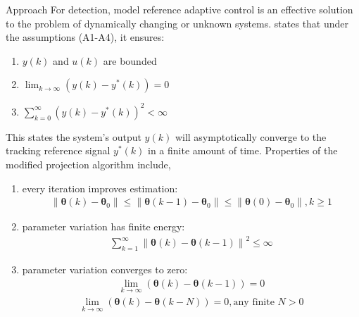 \begin{section}{Approach}
For detection, model reference adaptive control is an effective solution to the problem of dynamically changing or unknown systems. \cite{tao2003adaptive} states that under the assumptions (A1-A4), it ensures:
	\begin{enumerate}[label=(\roman*),leftmargin=4\parindent]
	\label{assumtions_ensure}
	\item $y(k)$ and $u(k)$ are bounded 
	\item $\lim_{k\to\infty}(y(k)-y^*(k))=0$
	\item $\sum_{k=0}^\infty(y(k)-y^*(k))^2<\infty$
	\end{enumerate}
This states the system's output $y(k)$ will asymptotically converge to the tracking reference signal $y^*(k)$ in a finite amount of time. Properties of the modified projection algorithm include,
    \begin{enumerate}[label=(\roman*),leftmargin=3\parindent]
	\item every iteration improves estimation:
	    \begin{align}
	        \|\bm{\theta}(k)-\bm{\theta}_0\|\leq\|\bm{\theta}(k-1)-\bm{\theta}_0\|\leq\|\bm{\theta}(0)-\bm{\theta}_0\|, k\geq1 \nonumber
	    \end{align}
	\item parameter variation has finite energy:
	    \begin{align}
	        \sum_{k=1}^\infty{\|\bm{\theta}(k)-\bm{\theta}(k-1)\|}^2\leq \infty \nonumber
	    \end{align}
	\item parameter variation converges to zero:
	    \begin{align}
	        \lim_{k\to\infty}(\bm{\theta}(k)-\bm{\theta}(k-1))=0 \nonumber
	    \end{align}
	    \begin{align}
	        \lim_{k\to\infty}(\bm{\theta}(k)-\bm{\theta}(k-N))=0, \text{any finite } N>0 \nonumber
	    \end{align}
	\end{enumerate}


\end{section}
